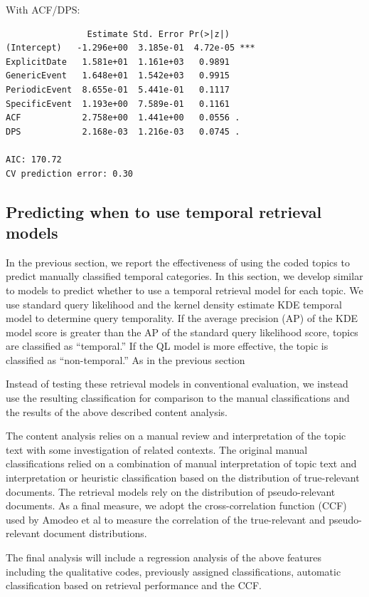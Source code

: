 \documentclass{sig-alternate}
\begin{document}
With ACF/DPS:
\begin{verbatim}
                Estimate Std. Error Pr(>|z|)    
(Intercept)   -1.296e+00  3.185e-01  4.72e-05 ***
ExplicitDate   1.581e+01  1.161e+03   0.9891    
GenericEvent   1.648e+01  1.542e+03   0.9915    
PeriodicEvent  8.655e-01  5.441e-01   0.1117    
SpecificEvent  1.193e+00  7.589e-01   0.1161    
ACF            2.758e+00  1.441e+00   0.0556 .  
DPS            2.168e-03  1.216e-03   0.0745 . 

AIC: 170.72
CV prediction error: 0.30
\end{verbatim}


\subsection{Predicting when to use temporal retrieval models}

In the previous section, we report the effectiveness of using the coded topics to predict manually classified temporal categories.  In this section, we develop similar to models to predict whether to use a temporal retrieval model for each topic. We use standard query likelihood \cite{XXX} and the kernel density estimate {KDE} temporal model \cite{Efron2014} to determine query temporality. If the average precision (AP) of the KDE model score is greater than the AP of the standard query likelihood score, topics are classified as ``temporal.''  If the QL model is more effective, the topic is classified as ``non-temporal.'' As in the previous section

Instead of testing these retrieval models in conventional evaluation, we instead use the resulting classification for comparison to the manual classifications and the results of the above described content analysis.

The content analysis relies on a manual review and interpretation of the topic text with some investigation of related contexts. The original manual classifications relied on a combination of manual interpretation of topic text and interpretation or heuristic classification based on the distribution of true-relevant documents. The retrieval models rely on the distribution of pseudo-relevant documents.  As a final measure, we adopt the cross-correlation function (CCF) used by Amodeo et al \cite{Amodeo2011} to measure the correlation of the true-relevant and pseudo-relevant document distributions. 

The final analysis will include a regression analysis of the above features including the qualitative codes, previously assigned classifications, automatic classification based on retrieval performance and the CCF.
\end{document}
